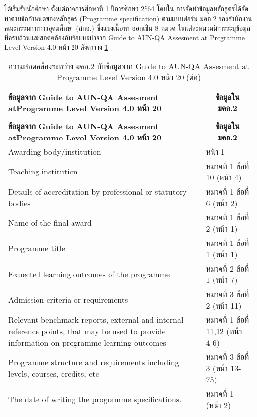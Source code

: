 \newpage
{}



\printprogram{} ได้เริ่มรับนักศึกษา
ตั้งแต่ภาคการศึกษาที่ 1 ปีการศึกษา 2564 โดยใน การจัดทำข้อมูลหลักสูตรได้จัดทำตามข้อกำหนดของหลักสูตร
(Programme specification) ตามแบบฟอร์ม มคอ.2 ของสำนักงานคณะกรรมการการอุดมศึกษา (สกอ.) ซึ่งแบ่งเนื้อหา
ออกเป็น 8 หมวด ในแต่ละหมวดมีการระบุข้อมูลที่ครบถ้วนและสอดคล้องกับข้อแนะนำจาก Guide to AUN-QA Assesment at Programme Level Version 4.0 หน้า 20 ดังตาราง \ref{Table:M2AUN}

\begin{longtable}{|p{}|p{}|}
\caption{ความสอดคล้องระหว่าง มคอ.2 กับข้อมูลจาก Guide to AUN-QA Assesment at Programme Level Version 4.0 หน้า  20}
\label{Table:M2AUN}
\\
\hline
{\bf ข้อมูลจาก Guide to AUN-QA Assesment at\newline  Programme Level Version 4.0 หน้า  20}&\multicolumn{1}{c|}{\bf ข้อมูลใน มคอ.2}\\
\hline
\endfirsthead
\caption[]{ความสอดคล้องระหว่าง มคอ.2 กับข้อมูลจาก Guide to AUN-QA Assesment at Programme Level Version 4.0 หน้า  20 (ต่อ)}
\\
\hline
{\bf ข้อมูลจาก Guide to AUN-QA Assesment at\newline  Programme Level Version 4.0 หน้า  20}&\multicolumn{1}{c|}{\bf ข้อมูลใน มคอ.2}\\
\hline
\endhead
Awarding body/institution& หน้า 1 \\\hline
Teaching institution&หมวดที่ 1 ข้อที่ 10 (หน้า 4)\\\hline
Details of accreditation by professional or statutory bodies& หมวดที่ 1 ข้อที่ 6 (หน้า 2)\\\hline
Name of the final award&หมวดที่ 1 ข้อที่ 2 (หน้า 1)\\\hline
Programme title&หมวดที่ 1 ข้อที่ 1 (หน้า 1)\\\hline
Expected learning outcomes of the programme&หมวดที่ 2 ข้อที่ 1 (หน้า 7)\\\hline
Admission criteria or requirements&หมวดที่ 3 ข้อที่ 2 (หน้า 11)\\\hline
Relevant benchmark reports, external and internal reference points, that may
be used to provide information on programme learning outcomes&หมวดที่ 1 ข้อที่ 11,12 (หน้า 4-6)\\\hline
Programme structure and requirements including levels, courses, credits, etc&หมวดที่ 3 ข้อที่ 3 (หน้า 13-75)\\\hline
The date of writing the programme specifications.& หมวดที่ 1 (หน้า 2)\\\hline
\end{longtable}	


